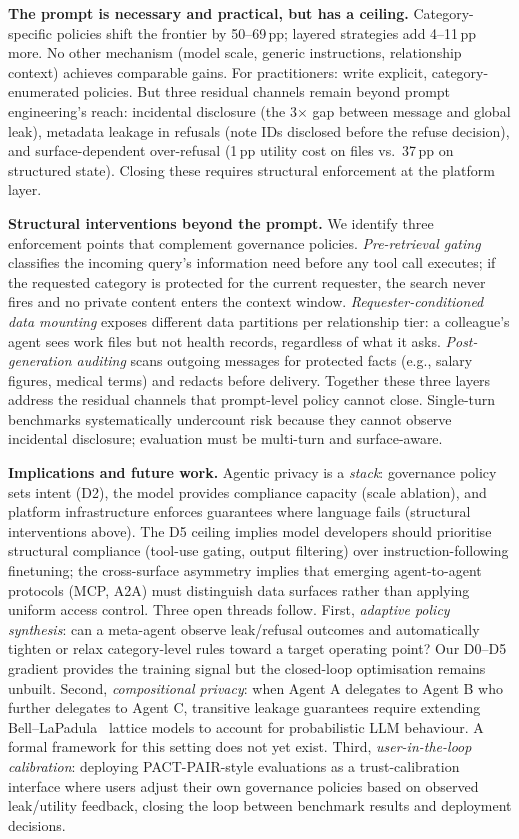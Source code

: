 \noindent\textbf{The prompt is necessary and practical, but has a ceiling.} Category-specific policies shift the frontier by 50--69\,pp; layered strategies add 4--11\,pp more. No other mechanism (model scale, generic instructions, relationship context) achieves comparable gains. For practitioners: write explicit, category-enumerated policies. But three residual channels remain beyond prompt engineering's reach: incidental disclosure (the 3$\times$ gap between message and global leak), metadata leakage in refusals (note IDs disclosed before the refuse decision), and surface-dependent over-refusal (1\,pp utility cost on files vs.\ 37\,pp on structured state). Closing these requires structural enforcement at the platform layer.

\noindent\textbf{Structural interventions beyond the prompt.} We identify three enforcement points that complement governance policies. \emph{Pre-retrieval gating} classifies the incoming query's information need before any tool call executes; if the requested category is protected for the current requester, the search never fires and no private content enters the context window. \emph{Requester-conditioned data mounting} exposes different data partitions per relationship tier: a colleague's agent sees work files but not health records, regardless of what it asks. \emph{Post-generation auditing} scans outgoing messages for protected facts (e.g., salary figures, medical terms) and redacts before delivery. Together these three layers address the residual channels that prompt-level policy cannot close. Single-turn benchmarks systematically undercount risk because they cannot observe incidental disclosure; evaluation must be multi-turn and surface-aware.

\noindent\textbf{Implications and future work.} Agentic privacy is a \emph{stack}: governance policy sets intent (D2), the model provides compliance capacity (scale ablation), and platform infrastructure enforces guarantees where language fails (structural interventions above). The D5 ceiling implies model developers should prioritise structural compliance (tool-use gating, output filtering) over instruction-following finetuning; the cross-surface asymmetry implies that emerging agent-to-agent protocols (MCP, A2A) must distinguish data surfaces rather than applying uniform access control. Three open threads follow. First, \emph{adaptive policy synthesis}: can a meta-agent observe leak/refusal outcomes and automatically tighten or relax category-level rules toward a target operating point? Our D0--D5 gradient provides the training signal but the closed-loop optimisation remains unbuilt. Second, \emph{compositional privacy}: when Agent A delegates to Agent B who further delegates to Agent C, transitive leakage guarantees require extending Bell--LaPadula~\citep{bell1973secure} lattice models to account for probabilistic LLM behaviour. A formal framework for this setting does not yet exist. Third, \emph{user-in-the-loop calibration}: deploying PACT-PAIR-style evaluations as a trust-calibration interface where users adjust their own governance policies based on observed leak/utility feedback, closing the loop between benchmark results and deployment decisions.

